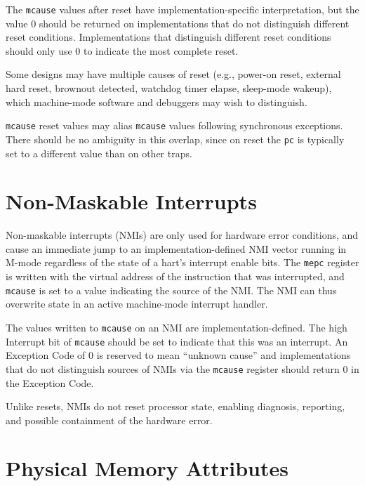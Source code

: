 The {\tt mcause} values after reset have implementation-specific
interpretation, but the value 0 should be returned on implementations
that do not distinguish different reset conditions. Implementations
that distinguish different reset conditions should only use 0 to
indicate the most complete reset.

\begin{commentary}
Some designs may have multiple causes of reset (e.g., power-on reset,
external hard reset, brownout detected, watchdog timer elapse,
sleep-mode wakeup), which machine-mode software and debuggers may wish
to distinguish.

{\tt mcause} reset values may alias {\tt mcause} values following synchronous
exceptions.  There should be no ambiguity in this overlap, since on reset the
{\tt pc} is typically set to a different value than on other traps.
\end{commentary}

\section{Non-Maskable Interrupts}
\label{sec:nmi}

Non-maskable interrupts (NMIs) are only used for hardware error
conditions, and cause an immediate jump to an implementation-defined
NMI vector running in M-mode regardless of the state of a hart's
interrupt enable bits.  The {\tt mepc} register is written with the
virtual address of the instruction that was interrupted,
and {\tt mcause} is set to a value indicating the source of the
NMI.  The NMI can thus overwrite state in an active machine-mode
interrupt handler.

The values written to {\tt mcause} on an NMI are
implementation-defined.  The high Interrupt bit of {\tt mcause} should
be set to indicate that this was an interrupt.  An Exception Code of 0
is reserved to mean ``unknown cause'' and implementations that do not
distinguish sources of NMIs via the {\tt mcause} register should
return 0 in the Exception Code.

Unlike resets, NMIs do not reset processor state, enabling diagnosis,
reporting, and possible containment of the hardware error.

\section{Physical Memory Attributes}
\label{sec:pma}

